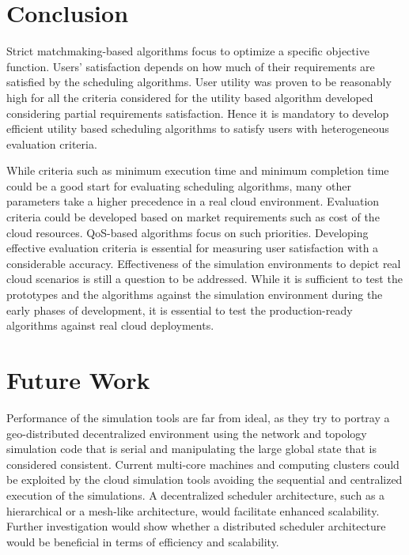 \documentclass{llncs}
\begin{document}
\section{Conclusion}
\balance
Strict matchmaking-based algorithms focus to optimize a specific objective function. Users' satisfaction depends on how much of their requirements are satisfied by the scheduling algorithms. User utility was proven to be reasonably high for all the criteria considered for the utility based algorithm developed considering partial requirements satisfaction. Hence it is mandatory to develop efficient utility based scheduling algorithms to satisfy users with heterogeneous evaluation criteria.

While criteria such as minimum execution time and minimum completion time could be a good start for evaluating scheduling algorithms, many other parameters take a higher precedence in a real cloud environment. Evaluation criteria could be developed based on market requirements such as cost of the cloud resources. QoS-based algorithms focus on such priorities. Developing effective evaluation criteria is essential for measuring user satisfaction with a considerable accuracy. Effectiveness of the simulation environments to depict real cloud scenarios is still a question to be addressed. While it is sufficient to test the prototypes and the algorithms against the simulation environment during the early phases of development, it is essential to test the production-ready algorithms against real cloud deployments.

\section{Future Work}
Performance of the simulation tools are far from ideal, as they try to portray a geo-distributed decentralized environment using the network and topology simulation code that is serial and manipulating the large global state that is considered consistent. Current multi-core machines and computing clusters could be exploited by the cloud simulation tools avoiding the sequential and centralized execution of the simulations. A decentralized scheduler architecture, such as a hierarchical or a mesh-like architecture, would facilitate enhanced scalability. Further investigation would show whether a distributed scheduler architecture would be beneficial in terms of efficiency and scalability.
\end{document}

